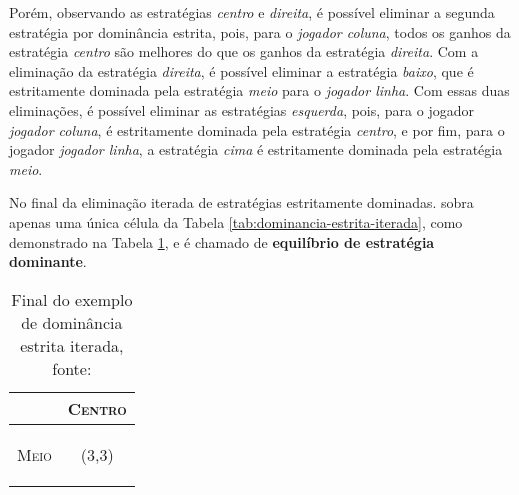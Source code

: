 Porém, observando as estratégias \emph{centro} e \emph{direita}, é possível eliminar a segunda estratégia por dominância estrita, pois, para o \emph{jogador coluna}, todos os ganhos da estratégia \emph{centro} são melhores do que os ganhos da estratégia \emph{direita}. Com a eliminação da estratégia \emph{direita}, é possível eliminar a estratégia \emph{baixo}, que é estritamente dominada pela estratégia \emph{meio} para o \emph{jogador linha}. Com essas duas eliminações, é possível eliminar as estratégias \emph{esquerda}, pois, para o jogador \emph{jogador coluna}, é estritamente dominada pela estratégia \emph{centro}, e por fim, para o jogador \emph{jogador linha}, a estratégia \emph{cima} é estritamente dominada pela estratégia \emph{meio}.

No final da eliminação iterada de estratégias estritamente dominadas. sobra apenas uma única célula da Tabela \ref{tab:dominancia-estrita-iterada}, como demonstrado na Tabela \ref{tab:final-dominancia-estrita-iterada}, e é chamado de \textbf{equilíbrio de estratégia dominante}.

\begin{table}[ht]
\centering
\begin{tabular}{|c|c|}
\cline{2-2}
\multicolumn{1}{c|}{} & {\scshape Centro} \tabularnewline
\hline
\begin{turn}{90}
{\scshape Meio}
\end{turn} &  {\Large(}{\Large 3,}{\Large 3)}\tabularnewline
\hline
\end{tabular}
\caption{Final do exemplo de dominância estrita iterada, fonte: \cite{spaniel_2011}}
\label{tab:final-dominancia-estrita-iterada}
\end{table}



